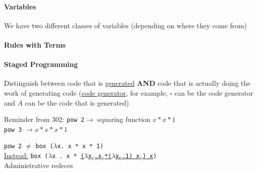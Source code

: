 \documentclass[12 pt]{article}
\begin{document}
       \paragraph{Variables}
       We have two different classes of variables (depending on where
       they come from)
       \begin{prooftree}
       \end{prooftree}
       \begin{prooftree}
       \end{prooftree}
       \paragraph{Rules with Terms}
       \begin{prooftree}
       \end{prooftree}
       \begin{prooftree}
       \end{prooftree}
       \paragraph{Staged Programming}
       Distinguish between code that is \underline{generated} \textbf{AND} code
       that is actually doing the work of generating code (\underline{code
         generator}, for example, $\square$ can be the code generator and
       $A$ can be the code that is generated)

       Reminder from 302: \texttt{pow 2}$\to $ squaring function $x * x * 1$
       \\ \texttt{pow 3} $\to x * x * x * 1$
       \begin{algorithmic}
         \Else
         \EndIf
       \end{algorithmic}
       \texttt{pow 2} $\neq$ \texttt{box ($\lambda$x. x * x * 1)}
       \\ \underline{Instead:} \texttt{box ($\lambda$x . x *
         \underline{($\lambda$x$_1$.x$_1$*($\lambda$x$_0$.1) x$_1$) x})}
       \\ Administrative redeces
     
\end{document}
